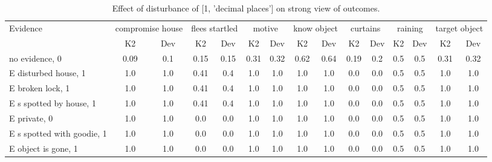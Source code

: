 \begin{table}\begin{tabular}{l|cc|cc|cc|cc|cc|cc|cc}\toprule\multirow{2}{*}{Evidence} & \multicolumn{2}{c}{compromise house}& \multicolumn{2}{c}{flees startled}& \multicolumn{2}{c}{motive}& \multicolumn{2}{c}{know object}& \multicolumn{2}{c}{curtains}& \multicolumn{2}{c}{raining}& \multicolumn{2}{c}{target object}\\& {K2} & {Dev}& {K2} & {Dev}& {K2} & {Dev}& {K2} & {Dev}& {K2} & {Dev}& {K2} & {Dev}& {K2} & {Dev}\\\midrule
no evidence, 0 & 0.09&0.1&0.15&0.15&0.31&0.32&0.62&0.64&0.19&0.2&0.5&0.5&0.31&0.32\\E disturbed house, 1 & 1.0&1.0&0.41&0.4&1.0&1.0&1.0&1.0&0.0&0.0&0.5&0.5&1.0&1.0\\E broken lock, 1 & 1.0&1.0&0.41&0.4&1.0&1.0&1.0&1.0&0.0&0.0&0.5&0.5&1.0&1.0\\E s spotted by house, 1 & 1.0&1.0&0.41&0.4&1.0&1.0&1.0&1.0&0.0&0.0&0.5&0.5&1.0&1.0\\E private, 0 & 1.0&1.0&0.0&0.0&1.0&1.0&1.0&1.0&0.0&0.0&0.5&0.5&1.0&1.0\\E s spotted with goodie, 1 & 1.0&1.0&0.0&0.0&1.0&1.0&1.0&1.0&0.0&0.0&0.5&0.5&1.0&1.0\\E object is gone, 1 & 1.0&1.0&0.0&0.0&1.0&1.0&1.0&1.0&0.0&0.0&0.5&0.5&1.0&1.0\\\bottomrule\end{tabular}\caption{Effect of disturbance of [1, 'decimal places'] on strong view of outcomes.}\end{table}